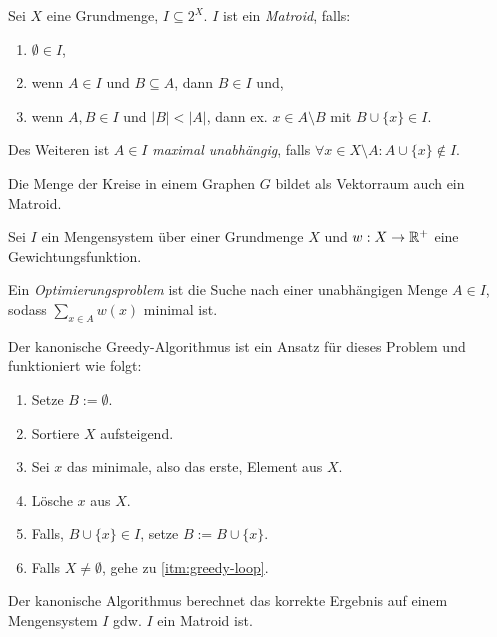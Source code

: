 \begin{definition}[Matroid]
    Sei $ X $ eine Grundmenge, $ I \subseteq 2^X $.
    $ I $ ist ein \textit{Matroid}, falls:
    \begin{enumerate}
        \item $ \emptyset \in I $,
        \item wenn $ A \in I $ und $ B \subseteq A $, dann $ B \in I $ und,
        \item wenn $ A, B \in I $ und $ |B| < |A| $, dann ex. $ x \in A \setminus B $ mit $ B \cup \{ x \} \in I $.
    \end{enumerate}

    Des Weiteren ist $ A \in I $ \textit{maximal unabhängig}, falls $ \forall x \in X \setminus A: A \cup \{ x \} \notin I $.
\end{definition}

\begin{remark}
    Die Menge der Kreise in einem Graphen $ G $ bildet als Vektorraum auch ein Matroid.
\end{remark}

\begin{definition}
    Sei $ I $ ein Mengensystem über einer Grundmenge $ X $ und $ w : X \rightarrow \mathbb{R}^+ $ eine Gewichtungsfunktion.

    Ein \textit{Optimierungsproblem} ist die Suche nach einer unabhängigen Menge $ A \in I $, sodass $ \sum_{x \in A} w(x) $ minimal ist.

    Der kanonische Greedy-Algorithmus ist ein Ansatz für dieses Problem und funktioniert wie folgt:
    \begin{enumerate}
        \item Setze $ B := \emptyset $.
        \item Sortiere $ X $ aufsteigend.
        \item \label{itm:greedy-loop} Sei $ x $ das minimale, also das erste, Element aus $ X $.
        \item Lösche $ x $ aus $ X $.
        \item Falls, $ B \cup \{ x \} \in I $, setze $ B := B \cup \{ x \} $.
        \item Falls $ X \ne \emptyset $, gehe zu \ref{itm:greedy-loop}.
    \end{enumerate}
\end{definition}

\begin{proposition}
    Der kanonische Algorithmus berechnet das korrekte Ergebnis auf einem Mengensystem $ I $ gdw. $ I $ ein Matroid ist.
\end{proposition}

